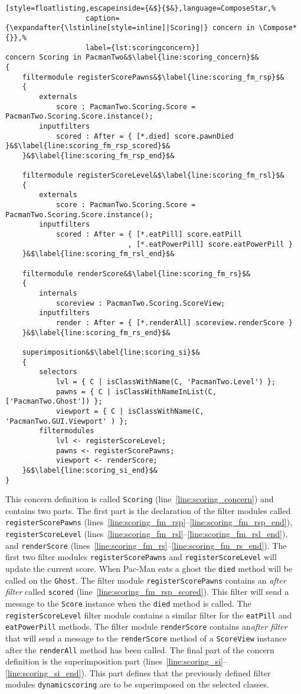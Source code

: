 \begin{lstlisting}[style=floatlisting,escapeinside={&$}{$&},language=ComposeStar,%
                   caption={\expandafter{\lstinline[style=inline]|Scoring|} concern in \Compose*{}},%
                   label={lst:scoringconcern}]
concern Scoring in PacmanTwo&$\label{line:scoring_concern}$&
{
	filtermodule registerScorePawns&$\label{line:scoring_fm_rsp}$&
	{
		externals
			score : PacmanTwo.Scoring.Score = PacmanTwo.Scoring.Score.instance();
		inputfilters
			scored : After = { [*.died] score.pawnDied }&$\label{line:scoring_fm_rsp_scored}$&
	}&$\label{line:scoring_fm_rsp_end}$&

	filtermodule registerScoreLevel&$\label{line:scoring_fm_rsl}$&
	{
		externals
			score : PacmanTwo.Scoring.Score = PacmanTwo.Scoring.Score.instance();
		inputfilters
			scored : After = { [*.eatPill] score.eatPill
			                 , [*.eatPowerPill] score.eatPowerPill }
	}&$\label{line:scoring_fm_rsl_end}$&

	filtermodule renderScore&$\label{line:scoring_fm_rs}$&
	{
		internals
			scoreview : PacmanTwo.Scoring.ScoreView;
		inputfilters
			render : After = { [*.renderAll] scoreview.renderScore }
	}&$\label{line:scoring_fm_rs_end}$&

	superimposition&$\label{line:scoring_si}$&
	{
		selectors
			lvl = { C | isClassWithName(C, 'PacmanTwo.Level') };
			pawns = { C | isClassWithNameInList(C, ['PacmanTwo.Ghost']) };
			viewport = { C | isClassWithName(C, 'PacmanTwo.GUI.Viewport' ) };
		filtermodules
			lvl <- registerScoreLevel;
			pawns <- registerScorePawns;
			viewport <- renderScore;
	}&$\label{line:scoring_si_end}$&
}
\end{lstlisting}

This concern definition is called \lstinline|Scoring| (line~\ref{line:scoring_concern}) and contains two parts.
The first part is the declaration of the filter modules called \lstinline|registerScorePawns| (lines~\ref{line:scoring_fm_rsp}--\ref{line:scoring_fm_rsp_end}), \lstinline|registerScoreLevel| (lines~\ref{line:scoring_fm_rsl}--\ref{line:scoring_fm_rsl_end}), and \lstinline|renderScore| (lines~\ref{line:scoring_fm_rs}--\ref{line:scoring_fm_rs_end}).
The first two filter modules \lstinline|registerScorePawns| and \lstinline|registerScoreLevel| will update the current score. When Pac-Man eats a ghost the \lstinline|died| method will be called on the \lstinline|Ghost|. The filter module \lstinline|registerScorePawns| contains an \emph{after filter} called \lstinline|scored| (line~\ref{line:scoring_fm_rsp_scored}). This filter will send a message to the \lstinline|Score| instance when the \lstinline|died| method is called. The \lstinline|registerScoreLevel| filter module contains a similar filter for the \lstinline|eatPill| and \lstinline|eatPowerPill| methods.
The filter module \lstinline|renderScore| contains an\emph{after filter} that will send a message to the \lstinline|renderScore| method of a \lstinline|ScoreView| instance after the \lstinline|renderAll| method has been called.
The final part of the concern definition is the superimposition part (lines~\ref{line:scoring_si}--\ref{line:scoring_si_end}).
This part defines that the previously defined filter modules \lstinline|dynamicscoring| are to be superimposed on the selected classes.

